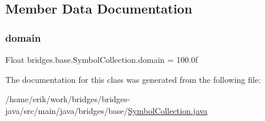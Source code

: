 \subsection{Member Data Documentation}
\mbox{\label{classbridges_1_1base_1_1_symbol_collection_a7624e96d2a4b5b6264791eb8dacbd350}} 
\subsubsection{\texorpdfstring{domain}{domain}}
{\footnotesize\ttfamily Float bridges.\+base.\+Symbol\+Collection.\+domain = 100.\+0f\hspace{0.3cm}{\ttfamily [protected]}}



The documentation for this class was generated from the following file\+:\begin{DoxyCompactItemize}
\item 
/home/erik/work/bridges/bridges-\/java/src/main/java/bridges/base/\hyperlink{_symbol_collection_8java}{Symbol\+Collection.\+java}\end{DoxyCompactItemize}
